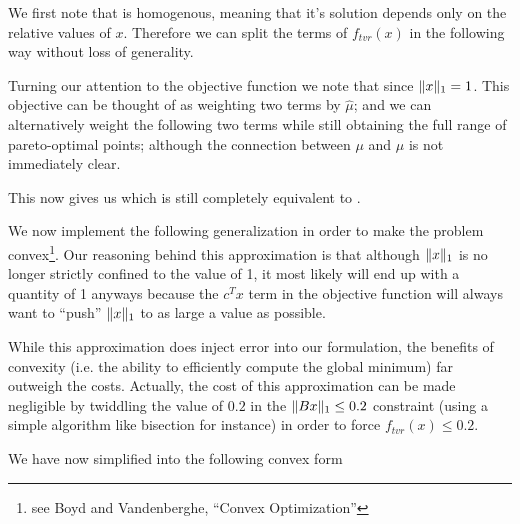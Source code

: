 \documentclass{article}
\begin{document}
    We first note that  is homogenous,
        meaning that it's solution depends only on the relative values of $x$.
    Therefore we can split the terms of $f_{tvr}(x)$ in the following way
        without loss of generality.

    Turning our attention to the objective function we note that
        since $\|x\|_1 = 1$.
    This objective can be thought of as 
        weighting two terms by $\hat{\mu}$;
        and we can alternatively weight the following two terms
        while still obtaining the full range of pareto-optimal points;
        although the connection between $\mu$ and $\hat{\mu}$
        is not immediately clear.

    This now gives us
        which is still completely equivalent to .

    We now implement the following generalization
        in order to make the problem 
        convex\footnote{see Boyd and Vandenberghe, ``Convex Optimization''}.
    Our reasoning behind this approximation
        is that although $\|x\|_1$ is no longer 
        strictly confined to the value of 1,
        it most likely will end up with a quantity of 1 anyways
        because the $c^T x$ term in the objective function will always want
        to ``push'' $\|x\|_1$ to as large a value as possible.

    While this approximation does inject error into our formulation,
        the benefits of convexity (i.e. the ability to efficiently compute
        the global minimum) far outweigh the costs.
    Actually, the cost of this approximation can be made negligible by
        twiddling the value of $0.2$ 
        in the $\|Bx\|_1 \le 0.2$ constraint 
        (using a simple algorithm like bisection for instance)
        in order to force $f_{tvr}(x) \le 0.2$.
    
    We have now simplified  into the following convex form
    
    
\end{document}
